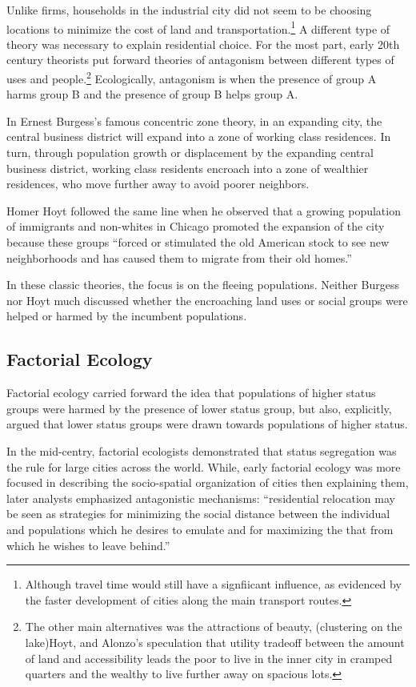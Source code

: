 Unlike firms, households in the industrial city did not seem to be
choosing locations to minimize the cost of land and
transportation.\footnote{Although travel time would still have a
  signfiicant influence, as evidenced by the faster development of
  cities along the main transport routes.} A different type of theory
was necessary to explain residential choice. For the most part,
early 20th century theorists put forward theories of antagonism
between different types of uses and people.\footnote{The other main
  alternatives was the attractions of beauty, (clustering on the
  lake)Hoyt, and Alonzo's speculation that utility tradeoff between
  the amount of land and accessibility leads the poor to live in the
  inner city in cramped quarters and the wealthy to live further away
  on spacious lots.} Ecologically, antagonism is when the presence of
group A harms group B and the presence of group B helps group A.

In Ernest Burgess's famous concentric zone theory, in an expanding
city, the central business district will expand into a zone of working
class residences. In turn, through population growth or displacement by the
expanding central business district, working class residents encroach 
into a zone of wealthier residences, who move further away to avoid
poorer neighbors.\cite{park_growth_1984}

Homer Hoyt followed the same line when he observed that a growing
population of immigrants and non-whites in Chicago promoted the
expansion of the city because these groups ``forced or stimulated the
old American stock to see new neighborhoods and has caused them to
migrate from their old homes.''\cite{hoyt_one_1970}

In these classic theories, the focus is on the fleeing populations.
Neither Burgess nor Hoyt much discussed whether the encroaching land
uses or social groups were helped or harmed by the incumbent
populations.

\subsection*{Factorial Ecology}
Factorial ecology carried forward the idea that populations of higher
status groups were harmed by the presence of lower status group, but
also, explicitly, argued that lower status groups were drawn towards
populations of higher status.

In the mid-centry, factorial ecologists demonstrated that status
segregation was the rule for large cities across the world. While,
early factorial ecology was more focused in describing the
socio-spatial organization of cities then explaining them,\cite{shevky_social_1955}
later analysts emphasized antagonistic mechanisms: ``residential
relocation may be seen as strategies for minimizing the social
distance between the individual and populations which he desires to
emulate and for maximizing the that from which he wishes to leave
behind.''\cite{timms_urban_1975}

